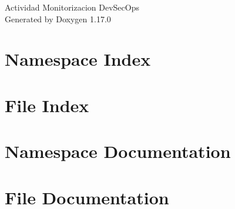 \documentclass[twoside]{book}
\newcommand{\+}{\discretionary{\mbox{\scriptsize$\hookleftarrow$}}{}{}}
\newcommand{\clearemptydoublepage}{%
    \newpage{\pagestyle{empty}\cleardoublepage}%
  }
\begin{document}
  \raggedbottom
    \hypersetup{pageanchor=false,
                bookmarksnumbered=true,
                pdfencoding=unicode
               }
  \begin{titlepage}
  \vspace*{7cm}
  \begin{center}%
  {\Large Actividad Monitorizacion Dev\+Sec\+Ops}\\
  \vspace*{1cm}
  {\large Generated by Doxygen 1.17.0}\\
  \end{center}
  \end{titlepage}
  \clearemptydoublepage
  \tableofcontents
  \clearemptydoublepage
  \hypersetup{pageanchor=true}
\chapter{Namespace Index}

\chapter{File Index}

\chapter{Namespace Documentation}

\chapter{File Documentation}

  \backmatter
  \newpage
  \clearemptydoublepage
  \printindex
\end{document}
